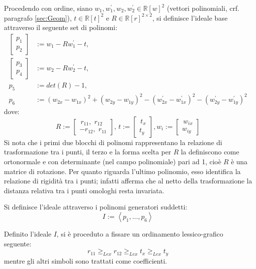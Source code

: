 Procedendo con ordine, siano $w_1, w_1^{'}, w_2, w_2^{'} \in \mathbb{R}[w]^2$ (vettori polinomiali, crf. paragrafo \ref{sec:Geom}),  $t \in \mathbb{R}[t]^2$ e $R \in \mathbb{R}[r]^{2 \times 2}$, si definisce l'ideale base attraverso il seguente set di polinomi:
\begin{align}
	\begin{bmatrix}p_1 \\ p_2 \end{bmatrix} &:= w_1 - Rw_1^{'} - t,\\
	\begin{bmatrix}p_3 \\ p_4 \end{bmatrix} &:= w_2 - Rw_2^{'} - t, \\
	p_5 &:= det(R) - 1,\\
	p_{6} &:= (w_{2x} - w_{1x})^2 + (w_{2y} - w_{1y})^2 - (w_{2x}^{'} - w_{1x}^{'})^2 - (w_{2y}^{'} - w_{1y}^{'})^2
\end{align}
dove: 
\begin{equation}
	R := \begin{bmatrix}
	\,r_{11}, \,\, r_{12} \\
	-r_{12}, \,\, r_{11}
	\end{bmatrix}, \, t := \begin{bmatrix}	\,t_x \\ t_y\end{bmatrix}, w_i := \begin{bmatrix}	\,w_{ix} \\ w_{iy}\end{bmatrix}
\end{equation}
Si nota che i primi due blocchi di polinomi rappresentano la relazione di trasformazione tra i punti, il terzo e la forma scelta per $R$ la definiscono come ortonormale e con determinante (nel campo polinomiale) pari ad 1, cioè $R$ è una matrice di rotazione. Per quanto riguarda l'ultimo polinomio, esso identifica la relazione di rigidità tra i punti; infatti afferma che al netto della trasformazione la distanza relativa tra i punti omologhi resta invariata.

Si definisce l'ideale attraverso i polinomi generatori suddetti:
\begin{equation}
	I := \left\langle p_1, \dots, p_{6}\right\rangle 
\end{equation}

Definito l'ideale $I$, si è proceduto a fissare un ordinamento lessico-grafico seguente:
\begin{equation}
	r_{11} \ge_{Lex} r_{12} \ge_{Lex} t_x \ge_{Lex} t_y
\end{equation}
mentre gli altri simboli sono trattati come coefficienti.


